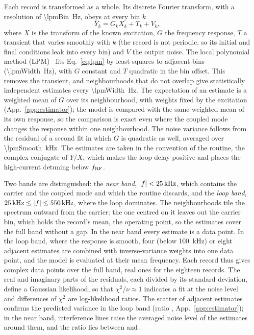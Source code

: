 Each record is transformed as a whole. Its discrete Fourier transform, with a resolution of \SI{\lpmBin}{Hz}, obeys at every bin $k$
\begin{equation}\label{eq:lpm}
Y_k=G_kX_k+T_k+V_k,
\end{equation}
where $X$ is the transform of the known excitation, $G$ the frequency response, $T$ a transient that varies smoothly with $k$ (the record is not periodic, so its initial and final conditions leak into every bin) and $V$ the output noise. The local polynomial method (LPM)~\cite{Pintelon2010,Pintelon2012} fits Eq.~\eqref{eq:lpm} by least squares to \lpmBins{} adjacent bins (\SI{\lpmWidth}{Hz}), with $G$ constant and $T$ quadratic in the bin offset. This removes the transient, and neighbourhoods that do not overlap give statistically independent estimates every \SI{\lpmWidth}{Hz}. The expectation of an estimate is a weighted mean of $G$ over its neighbourhood, with weights fixed by the excitation (App.~\ref{app:estimator}); the model is compared with the same weighted mean of its own response, so the comparison is exact even where the coupled mode changes the response within one neighbourhood. The noise variance follows from the residual of a second fit in which $G$ is quadratic as well, averaged over \SI{\lpmSmooth}{kHz}. The estimates are taken in the convention of the routine, the complex conjugate of $Y/X$, which makes the loop delay positive and places the high-current detuning below $f_\mathrm{RF}$.

Two bands are distinguished: the \emph{near band}, $|f|<\SI{25}{kHz}$, which contains the carrier and the coupled mode and which the routine discards, and the \emph{loop band}, $\SI{25}{kHz}\le|f|\le\SI{550}{kHz}$, where the loop dominates. The neighbourhoods tile the spectrum outward from the carrier; the one centred on it leaves out the carrier bin, which holds the record's mean, the operating point, so the estimates cover the full band without a gap. In the near band every estimate is a data point. In the loop band, where the response is smooth, four (below \SI{100}{kHz}) or eight adjacent estimates are combined with inverse-variance weights into one data point, and the model is evaluated at their mean frequency. Each record thus gives \nCellsRecord{} complex data points over the full band, \nPoints{} real ones for the eighteen records. The real and imaginary parts of the residuals, each divided by its standard deviation, define a Gaussian likelihood, so that $\chi^2/\nu\approx1$ indicates a fit at the noise level and differences of $\chi^2$ are log-likelihood ratios. The scatter of adjacent estimates confirms the predicted variance in the loop band (ratio \calibMedian, App.~\ref{app:estimator}); in the near band, interference lines raise the averaged noise level of the estimates around them, and the ratio lies between \calibNearLo{} and \calibNearHi.

